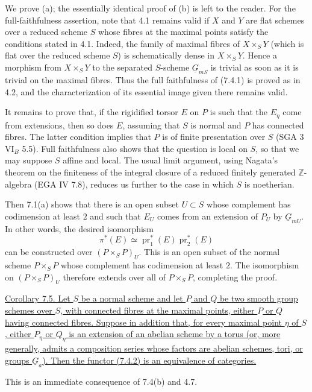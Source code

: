 We prove (a); the essentially identical proof of (b) is left to the reader.
For the full-faithfulness assertion, note that 4.1 remains valid if $X$ and
$Y$ are flat schemes over a reduced scheme $S$ whose fibres at the maximal
points satisfy the conditions stated in 4.1.  Indeed, the family of maximal
fibres of $X\times_S Y$ (which is flat over the reduced scheme $S$) is
schematically dense in $X\times_S Y$.  Hence a morphism from
$X\times_S Y$ to the separated $S$-scheme $\underline G_{mS}$ is trivial
as soon as it is trivial on the maximal fibres.  Thus the full faithfulness
of (7.4.1) is proved as in 4.2, and the characterization of its essential
image given there remains valid.

It remains to prove that, if the rigidified torsor $E$ on $P$ is such that
the $E_\eta$ come from extensions, then so does $E$, assuming that $S$ is
normal and $P$ has connected fibres.  The latter condition implies that
$P$ is of finite presentation over $S$ (SGA 3 $\mathrm{VI}_B$ 5.5).
Full faithfulness also shows that the question is local on $S$, so that we
may suppose $S$ affine and local.  The usual limit argument, using
Nagata's theorem on the finiteness of the integral closure of a reduced
finitely generated $\mathbb Z$-algebra (EGA IV 7.8), reduces us further to
the case in which $S$ is noetherian.

Then 7.1(a) shows that there is an open subset $U\subset S$ whose complement
has codimension at least $2$ and such that $E_U$ comes from an extension of
$P_U$ by $\underline G_{mU}$.  In other words, the desired isomorphism
\[
 \pi^*(E)\simeq
 \operatorname{pr}_1^*(E)\operatorname{pr}_2^*(E)
\]
can be constructed over $(P\times_S P)_U$.  This is an open subset of the
normal scheme $P\times_S P$ whose complement has codimension at least $2$.
The isomorphism on $(P\times_S P)_U$ therefore extends over all of
$P\times_S P$, completing the proof.

\medskip
\noindent\underline{Corollary 7.5.  Let $S$ be a normal scheme and let $P$
and $Q$ be two smooth group schemes over $S$, with connected fibres at the
maximal points, either $P$ or $Q$ having connected fibres.  Suppose in
addition that, for every maximal point $\eta$ of $S$, either $P_\eta$ or
$Q_\eta$ is an extension of an abelian scheme by a torus (or, more
generally, admits a composition series whose factors are abelian schemes,
tori, or groups $\underline G_a$).  Then the functor (7.4.2) is an
equivalence of categories.}

This is an immediate consequence of 7.4(b) and 4.7.

